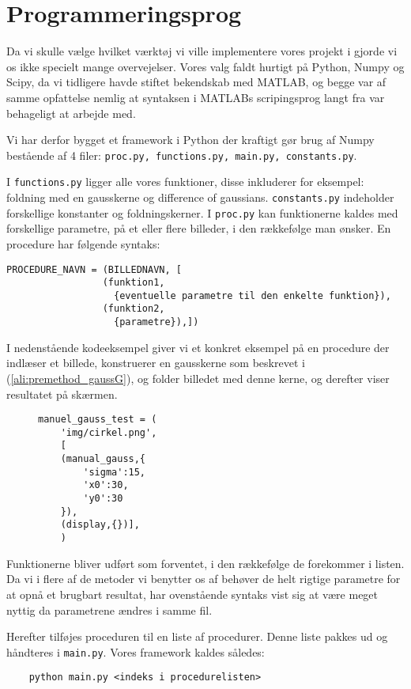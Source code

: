\section{Programmeringsprog}
Da vi skulle vælge hvilket værktøj vi ville implementere vores projekt i gjorde vi os ikke specielt mange overvejelser. 
Vores valg faldt hurtigt på Python, Numpy og Scipy, da vi tidligere havde stiftet bekendskab med MATLAB, og begge var af samme opfattelse nemlig
at syntaksen i MATLABs scripingsprog langt fra var behageligt at arbejde med.


Vi har derfor bygget et framework i Python der kraftigt gør brug af Numpy bestående af 4 filer: \texttt{proc.py, functions.py, main.py, constants.py}.

I \texttt{functions.py} ligger alle vores funktioner, disse inkluderer for eksempel: foldning med en gausskerne og difference of gaussians.
\texttt{constants.py} indeholder forskellige konstanter og foldningskerner. I \texttt{proc.py} kan funktionerne kaldes med forskellige parametre, på et eller flere billeder, i den rækkefølge man ønsker.
En procedure har følgende syntaks:
\begin{verbatim}
PROCEDURE_NAVN = (BILLEDNAVN, [
                 (funktion1,
                   {eventuelle parametre til den enkelte funktion}),
                 (funktion2,
                   {parametre}),])
\end{verbatim}
I nedenstående kodeeksempel giver vi et konkret eksempel på en procedure der indlæser et billede, konstruerer en gausskerne som beskrevet i (\ref{ali:premethod_gaussG}), og folder billedet med denne kerne, og derefter viser resultatet på skærmen.
\begin{figure}[H]
\begin{verbatim}
manuel_gauss_test = ( 
    'img/cirkel.png',
    [
    (manual_gauss,{
        'sigma':15,
        'x0':30,
        'y0':30
    }),
    (display,{})],
    )
\end{verbatim}
\end{figure}
Funktionerne bliver udført som forventet, i den rækkefølge de forekommer i listen.
Da vi i flere af de metoder vi benytter os af behøver de helt rigtige parametre for at opnå et brugbart resultat, har ovenstående syntaks vist sig at være meget nyttig da parametrene ændres i samme fil.

Herefter tilføjes proceduren til en liste af procedurer. Denne liste pakkes ud og håndteres i \texttt{main.py}. Vores framework kaldes således: 
\begin{verbatim}
	python main.py <indeks i procedurelisten>
\end{verbatim}

